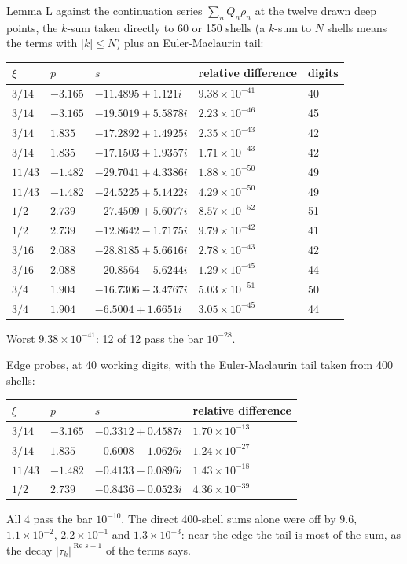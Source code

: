\documentclass[11pt]{article}
\newcommand{\re}{\operatorname{Re}}
\begin{document}
Lemma L against the continuation series $\sum_nQ_n\rho_n$ at the twelve drawn deep points, the $k$-sum taken directly to 60 or 150 shells (a $k$-sum to $N$ shells means the terms with $|k|\le N$) plus an Euler-Maclaurin tail:
\begin{center}
\begin{tabular}{lllll}
$\xi$ & $p$ & $s$ & relative difference & digits\\
\hline
$3/14$ & $-3.165$ & $-11.4895+1.121i$ & $9.38\times10^{-41}$ & 40\\
$3/14$ & $-3.165$ & $-19.5019+5.5878i$ & $2.23\times10^{-46}$ & 45\\
$3/14$ & $1.835$ & $-17.2892+1.4925i$ & $2.35\times10^{-43}$ & 42\\
$3/14$ & $1.835$ & $-17.1503+1.9357i$ & $1.71\times10^{-43}$ & 42\\
$11/43$ & $-1.482$ & $-29.7041+4.3386i$ & $1.88\times10^{-50}$ & 49\\
$11/43$ & $-1.482$ & $-24.5225+5.1422i$ & $4.29\times10^{-50}$ & 49\\
$1/2$ & $2.739$ & $-27.4509+5.6077i$ & $8.57\times10^{-52}$ & 51\\
$1/2$ & $2.739$ & $-12.8642-1.7175i$ & $9.79\times10^{-42}$ & 41\\
$3/16$ & $2.088$ & $-28.8185+5.6616i$ & $2.78\times10^{-43}$ & 42\\
$3/16$ & $2.088$ & $-20.8564-5.6244i$ & $1.29\times10^{-45}$ & 44\\
$3/4$ & $1.904$ & $-16.7306-3.4767i$ & $5.03\times10^{-51}$ & 50\\
$3/4$ & $1.904$ & $-6.5004+1.6651i$ & $3.05\times10^{-45}$ & 44\\
\end{tabular}
\end{center}
Worst $9.38\times10^{-41}$: 12 of 12 pass the bar $10^{-28}$.

Edge probes, at 40 working digits, with the Euler-Maclaurin tail taken from 400 shells:
\begin{center}
\begin{tabular}{llll}
$\xi$ & $p$ & $s$ & relative difference\\
\hline
$3/14$ & $-3.165$ & $-0.3312+0.4587i$ & $1.70\times10^{-13}$\\
$3/14$ & $1.835$ & $-0.6008-1.0626i$ & $1.24\times10^{-27}$\\
$11/43$ & $-1.482$ & $-0.4133-0.0896i$ & $1.43\times10^{-18}$\\
$1/2$ & $2.739$ & $-0.8436-0.0523i$ & $4.36\times10^{-39}$\\
\end{tabular}
\end{center}
All 4 pass the bar $10^{-10}$. The direct 400-shell sums alone were off by $9.6$, $1.1\times10^{-2}$, $2.2\times10^{-1}$ and $1.3\times10^{-3}$: near the edge the tail is most of the sum, as the decay $|\tau_k|^{\re s-1}$ of the terms says.
\end{document}
